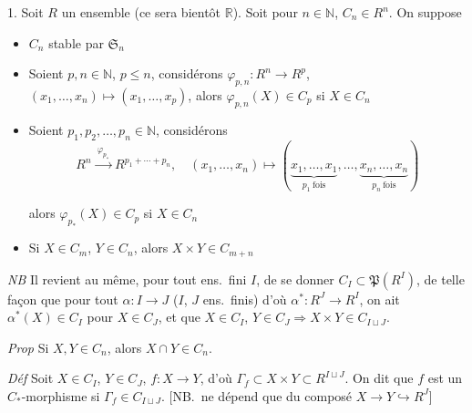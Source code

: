 \documentclass[11pt,a4paper]{article}
\begin{document}
1. Soit $R$ un ensemble (ce sera bientôt $\mathbb{R}$). \struck{\ill{}}
Soit pour  $n \in \mathbb{N}$, $C_n \in R^n$. On suppose
\begin{itemize}
  \item[(1)] $C_n$ stable par $\mathfrak{S}_n$
  \item[(2)] Soient $p, n \in \mathbb{N}$, $p \leqslant n$, considérons
  $\varphi_{p,n} : R^n \to R^p$, $(x_1, \ldots, x_n) \mapsto (x_1,
  \ldots, x_p)$, alors $\varphi_{p,n}(X) \in C_p$ si $X \in C_n$
  \item[(3)] Soient $p_1, p_2, \ldots, p_n \in \mathbb{N}$,  considérons
  \[
    R^n \xrightarrow{\ \varphi_{p_{*}}\ } R^{p_1 + \cdots + p_n}, \quad
    (x_1, \ldots, x_n) \mapsto (\underbrace{x_1, \ldots,
    x_1}_{p_1\ \text{fois}}, \ldots, \underbrace{x_n, \ldots,
    x_n}_{p_n\ \text{fois}})
  \]

  alors $\varphi_{p_{*}}(X) \in C_p$ si $X \in C_n$
  \item[(4)] Si $X \in C_m$, $Y \in C_n$, alors $X \times Y \in C_{m+n}$
\end{itemize}

\emph{NB} Il revient au même, pour tout ens.\ fini $I$, de se donner
\struck{\ill{}} $C_I \subset \mathfrak{P}(R^I)$, de telle façon que pour
tout $\alpha : I \to J$ ($I$, $J$ ens.\ finis) d'où $\alpha^{*} : R^J \to
R^I$, on ait $\alpha^{*}(X) \in C_I$ pour $X \in C_J$, et que $X \in C_I$,
$Y \in C_J \Rightarrow X \times Y \in C_{I \sqcup J}$.

\emph{Prop} Si $X, Y \in C_n$, alors $X \cap Y \in C_n$.

\emph{Déf} Soit $X \in C_I$, $Y \in C_J$, $f : X \to Y$, d'où $\Gamma_f
\subset X \times Y \subset R^{I \sqcup J}$. On dit que $f$ est un
$C_{*}$-morphisme si $\Gamma_f \in C_{I \sqcup J}$. [NB.\ ne dépend que du composé
$X \to Y \hookrightarrow R^J$]

\end{document}
